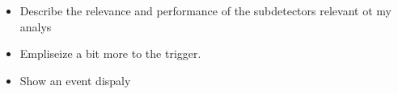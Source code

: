 

\begin{itemize}
  \item Describe the relevance and performance of the subdetectors relevant ot my analys
  \item Empliseize a bit more to the trigger.
  \item Show an event dispaly
\end{itemize}
